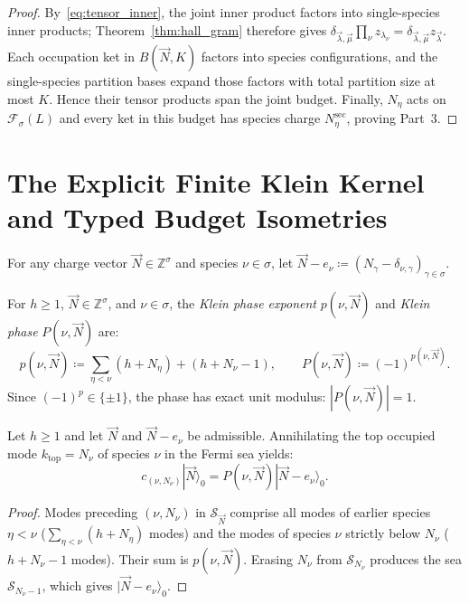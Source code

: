 \begin{proof}
By~\eqref{eq:tensor_inner}, the joint inner product factors into single-species inner products; Theorem~\ref{thm:hall_gram} therefore gives $\delta_{\vec{\lambda},\vec{\mu}}\prod_\nu z_{\lambda_\nu}=\delta_{\vec{\lambda},\vec{\mu}}z_{\vec{\lambda}}$. Each occupation ket in $B(\vec{N},K)$ factors into species configurations, and the single-species partition bases expand those factors with total partition size at most $K$. Hence their tensor products span the joint budget. Finally, $N_\eta$ acts on $\mathcal{F}_\sigma(L)$ and every ket in this budget has species charge $N_\eta^{\mathrm{sec}}$, proving Part~3.
\end{proof}

\section{The Explicit Finite Klein Kernel and Typed Budget Isometries}

For any charge vector $\vec{N} \in \mathbb{Z}^\sigma$ and species $\nu \in \sigma$, let $\vec{N} - e_\nu \coloneqq (N_\gamma - \delta_{\nu, \gamma})_{\gamma \in \sigma}$.

\begin{definition}
\label{def:klein_phase}
For $h \ge 1$, $\vec{N} \in \mathbb{Z}^\sigma$, and $\nu \in \sigma$, the \emph{Klein phase exponent} $p(\nu, \vec{N})$ and \emph{Klein phase} $P(\nu, \vec{N})$ are:
\begin{equation}
\label{eq:phase_exponent}
p(\nu, \vec{N}) \coloneqq \sum_{\eta < \nu} (h + N_\eta) + (h + N_\nu - 1), \qquad P(\nu, \vec{N}) \coloneqq (-1)^{p(\nu, \vec{N})}.
\end{equation}
Since $(-1)^p \in \{\pm 1\}$, the phase has exact unit modulus: $|P(\nu, \vec{N})| = 1$.
\end{definition}

\begin{lemma}
\label{lem:ground_top_annihilation}
Let $h \ge 1$ and let $\vec{N}$ and $\vec{N} - e_\nu$ be admissible. Annihilating the top occupied mode $k_{\mathrm{top}} = N_\nu$ of species $\nu$ in the Fermi sea yields:
\begin{equation}
\label{eq:car_top_annihilation}
c_{(\nu, N_\nu)} |\vec{N}\rangle_0 = P(\nu, \vec{N}) |\vec{N} - e_\nu\rangle_0.
\end{equation}
\end{lemma}

\begin{proof}
Modes preceding $(\nu, N_\nu)$ in $\mathcal{S}_{\vec{N}}$ comprise all modes of earlier species $\eta < \nu$ ($\sum_{\eta < \nu} (h + N_\eta)$ modes) and the modes of species $\nu$ strictly below $N_\nu$ ($h + N_\nu - 1$ modes). Their sum is $p(\nu, \vec{N})$. Erasing $N_\nu$ from $\mathcal{S}_{N_\nu}$ produces the sea $\mathcal{S}_{N_\nu - 1}$, which gives $|\vec{N} - e_\nu\rangle_0$.
\end{proof}

